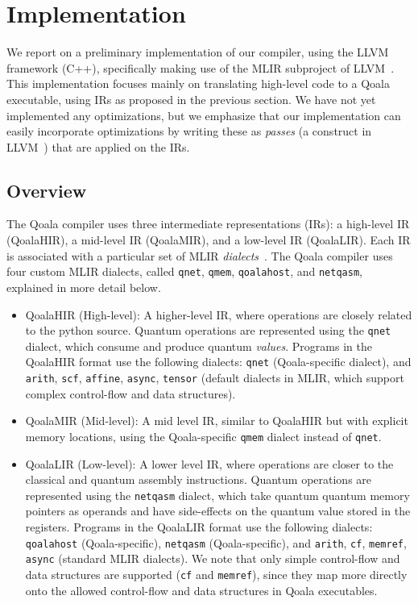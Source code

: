 \section{Implementation}

We report on a preliminary implementation of our compiler, using the LLVM framework (C++), specifically making use of the MLIR subproject of LLVM~\cite{lattner_mlir_2020}.
This implementation focuses mainly on translating high-level code to a Qoala executable, using \acf{IR}s as proposed in the previous section.
We have not yet implemented any optimizations, but we emphasize that our implementation can easily incorporate optimizations by writing these as \emph{passes} (a construct in LLVM~\cite{lattner_llvm_2004}) that are applied on the IRs.

\subsection{Overview}
The Qoala compiler uses three intermediate representations (IRs):
a high-level IR (QoalaHIR), a mid-level IR (QoalaMIR), and a low-level IR (QoalaLIR).
Each IR is associated with a particular set of MLIR \emph{dialects}~\cite{lattner_mlir_2020}.
The Qoala compiler uses four custom MLIR dialects, called \texttt{qnet}, \texttt{qmem}, \texttt{qoalahost}, and \texttt{netqasm}, explained in more detail below.

\begin{itemize}
    \item QoalaHIR (High-level): A higher-level IR, where operations are closely related
    to the python source.
    Quantum operations are represented using the \texttt{qnet} dialect, which consume and produce quantum \emph{values}.
    Programs in the QoalaHIR format use the following dialects: \texttt{qnet} (Qoala-specific dialect), and \texttt{arith}, \texttt{scf}, \texttt{affine}, \texttt{async}, \texttt{tensor} (default dialects in MLIR, which support complex control-flow and data structures).
    \item QoalaMIR (Mid-level): A mid level IR, similar to QoalaHIR but with explicit memory locations, using the Qoala-specific \texttt{qmem} dialect instead of \texttt{qnet}.
    \item QoalaLIR (Low-level): A lower level IR, where operations are closer to the classical and quantum assembly instructions.
    Quantum operations are represented using the \texttt{netqasm} dialect, which take quantum quantum memory pointers as operands and have side-effects on the quantum value stored in the registers.
    Programs in the QoalaLIR format use the following dialects: \texttt{qoalahost} (Qoala-specific), \texttt{netqasm} (Qoala-specific), and \texttt{arith}, \texttt{cf}, \texttt{memref}, \texttt{async} (standard MLIR dialects).
    We note that only simple control-flow and data structures are supported (\texttt{cf} and \texttt{memref}), since they map more directly onto the allowed control-flow and data structures in Qoala executables.
\end{itemize}

